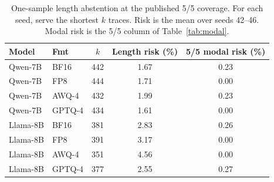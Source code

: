 \documentclass[11pt,a4paper]{article}
\begin{document}
\begin{table}[!htbp]
\centering
\caption{One-sample length abstention at the published 5/5 coverage. For each seed, serve the shortest $k$ traces. Risk is the mean over seeds 42--46. Modal risk is the 5/5 column of Table~\ref{tab:modal}.}
\label{tab:length-abstain}
\small
\begin{tabular}{llccc}
\toprule
\textbf{Model} & \textbf{Fmt} & $k$ & \textbf{Length risk (\%)} & \textbf{5/5 modal risk (\%)} \\
\midrule
Qwen-7B & BF16 & 442 & 1.67 & 0.23 \\
Qwen-7B & FP8 & 444 & 1.71 & 0.00 \\
Qwen-7B & AWQ-4 & 432 & 1.99 & 0.23 \\
Qwen-7B & GPTQ-4 & 434 & 1.61 & 0.00 \\
Llama-8B & BF16 & 381 & 2.83 & 0.26 \\
Llama-8B & FP8 & 391 & 3.17 & 0.00 \\
Llama-8B & AWQ-4 & 351 & 4.56 & 0.00 \\
Llama-8B & GPTQ-4 & 377 & 2.55 & 0.27 \\
\bottomrule
\end{tabular}
\end{table}
\end{document}
